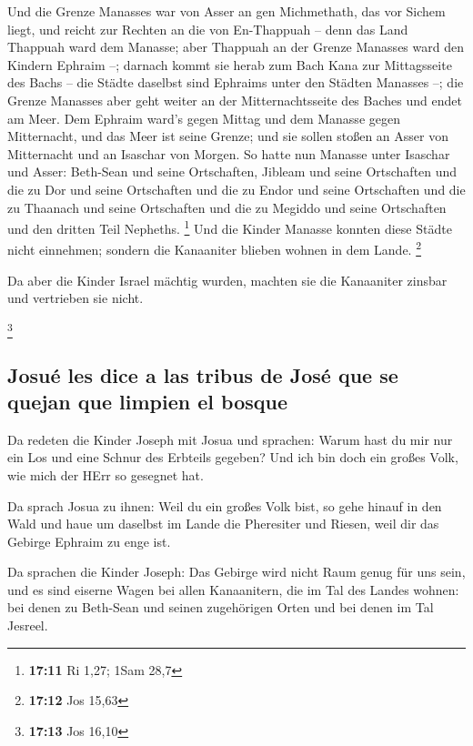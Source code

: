  Und die Grenze Manasses war von Asser an gen Michmethath,
das vor Sichem liegt, und reicht zur Rechten an die von En-Thappuah --
 denn das Land Thappuah ward dem Manasse; aber Thappuah an
der Grenze Manasses ward den Kindern Ephraim --;  darnach
kommt sie herab zum Bach Kana zur Mittagsseite des Bachs -- die Städte
daselbst sind Ephraims unter den Städten Manasses --; die Grenze
Manasses aber geht weiter an der Mitternachtsseite des Baches und endet
am Meer.  Dem Ephraim ward's gegen Mittag und dem Manasse
gegen Mitternacht, und das Meer ist seine Grenze; und sie sollen stoßen
an Asser von Mitternacht und an Isaschar von Morgen.  So
hatte nun Manasse unter Isaschar und Asser: Beth-Sean und seine
Ortschaften, Jibleam und seine Ortschaften und die zu Dor und seine
Ortschaften und die zu Endor und seine Ortschaften und die zu Thaanach
und seine Ortschaften und die zu Megiddo und seine Ortschaften und den
dritten Teil Nepheths. \footnote{\textbf{17:11} Ri 1,27; 1Sam 28,7}
 Und die Kinder Manasse konnten diese Städte nicht
einnehmen; sondern die Kanaaniter blieben wohnen in dem Lande.
\footnote{\textbf{17:12} Jos 15,63}

 Da aber die Kinder Israel mächtig wurden, machten sie
die Kanaaniter zinsbar und vertrieben sie nicht.

\footnote{\textbf{17:13} Jos 16,10}

\hypertarget{josuuxe9-les-dice-a-las-tribus-de-josuxe9-que-se-quejan-que-limpien-el-bosque}{%
\subsection{Josué les dice a las tribus de José que se quejan que
limpien el
bosque}\label{josuuxe9-les-dice-a-las-tribus-de-josuxe9-que-se-quejan-que-limpien-el-bosque}}

 Da redeten die Kinder Joseph mit Josua und sprachen:
Warum hast du mir nur ein Los und eine Schnur des Erbteils gegeben? Und
ich bin doch ein großes Volk, wie mich der HErr so gesegnet hat.

 Da sprach Josua zu ihnen: Weil du ein großes Volk bist,
so gehe hinauf in den Wald und haue um daselbst im Lande die Pheresiter
und Riesen, weil dir das Gebirge Ephraim zu enge ist.

 Da sprachen die Kinder Joseph: Das Gebirge wird nicht
Raum genug für uns sein, und es sind eiserne Wagen bei allen
Kanaanitern, die im Tal des Landes wohnen: bei denen zu Beth-Sean und
seinen zugehörigen Orten und bei denen im Tal Jesreel.


